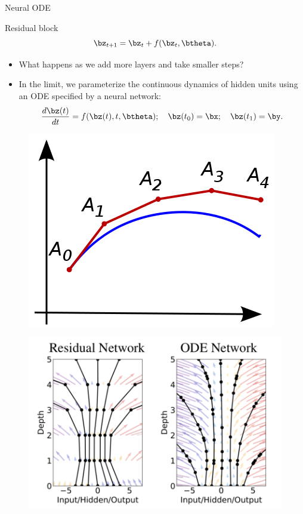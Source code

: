 \begin{frame}{Neural ODE}
	\begin{block}{Residual block}
	\vspace{-0.3cm}
	\[
	    \bz_{t+1} = \bz_t + f(\bz_t, \btheta).
	\]
	\vspace{-0.4cm}
	\end{block}
	\begin{itemize}
		\item What happens as we add more layers and take smaller steps? \\
		\item In the limit, we parameterize the continuous dynamics of hidden units using an ODE specified by a neural network: 
	\[
	    \frac{d \bz(t)}{dt} = f(\bz(t), t, \btheta); \quad \bz(t_0) = \bx; \quad \bz(t_1) = \by.
	\]
	\end{itemize}
	\begin{minipage}[t]{0.4\columnwidth}
		\begin{figure}
			\centering
			\includegraphics[width=0.9\linewidth]{figs/euler}
		\end{figure}
	\end{minipage}%
	\begin{minipage}[t]{0.6\columnwidth}
		\begin{figure}
			\centering
			\includegraphics[width=0.8\linewidth]{figs/resnet_vs_neural_ode.png}
		\end{figure}
	\end{minipage}

\end{frame}

